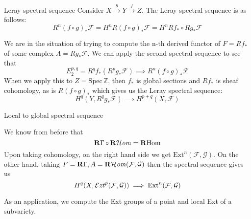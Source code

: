 \begin{example}{Leray spectral sequence}{} Consider $X\xrightarrow{g} Y \xrightarrow{f} Z$. The Leray spectral sequence is as follows: $$R^n(f\circ g)_{*}\mathcal{F}=H^nR(f\circ g)_{*}\mathcal{F}=H^n Rf_{*}\circ Rg_{*} \mathcal{F}$$

We are in the situation of trying to compute the n-th derived functor of $F=Rf_*$ of some complex $A=Rg_*\mathcal{F}$. We can apply the second spectral sequence to see that $$E_{2}^{p,q}=R^qf_{*}(R^pg_{*}\mathcal{F})\implies R^n(f\circ g)_{*} \mathcal{F}$$
When we apply this to $Z=\mathrm{Spec}\,\mathbb{Z}$, then $f_*$ is global sections and $Rf_*$ is sheaf cohomology, as is $R(f\circ g)_*$ which gives us the Leray spectral sequence: $$H^q(Y, R^qg_{*}\mathcal{F})\implies H^{p+q}(X,\mathcal{F})$$
\end{example}



\begin{example}{Local to global spectral sequence}{}

We know from before that $$\operatorname{\mathbf{R}\Gamma}\circ \operatorname{\mathbf{R}\mathcal{H}\mathit{om}}=\operatorname{\mathbf{R}Hom}$$
Upon taking cohomology, on the right hand side we get $\mathrm{Ext}^n(\mathcal{F}, \mathcal{G}).$ On the other hand, taking $F=\operatorname{\mathbf{R}\Gamma}, A=\operatorname{\mathbf{R}\mathcal{H}\mathit{om}}(\mathcal{ F}, \mathcal{G})$ then the spectral sequence gives us $$H^q(X, \operatorname{\mathcal{E}\mathit{xt}}^p(\mathcal{F, \mathcal{G))}}\implies \mathrm{Ext}^n(\mathcal{F},\mathcal{G)}$$ \end{example}

As an application, we compute the Ext groups of a point and local Ext of a subvariety. 

